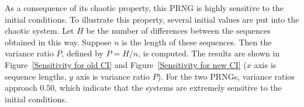 As a consequence of its chaotic property, this PRNG is highly sensitive to the initial conditions. To illustrate this property, several initial values are put into the chaotic system. Let $H$ be the number 
of differences between the sequences obtained in this way. Suppose $n$ is the length of these 
sequences. Then the variance ratio $P$, defined by $P = H / n$, is computed. The results are 
shown in Figure~\ref{Sensitivity for old CI} and Figure~\ref{Sensitivity for new CI} ($x$ axis is sequence lengths, $y$ axis is variance ratio $P$). For the two PRNGs, variance 
ratios approach $0.50$, which indicate that the systems are extremely sensitive to the initial 
conditions.
\begin{figure}
\centering
{} \hspace{0.5cm}
\end{figure}
